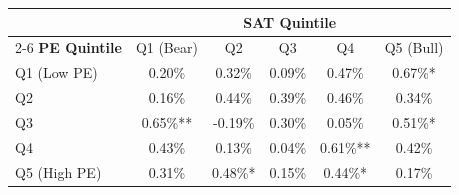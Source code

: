 \begin{tabular}{lccccc}
\toprule
& \multicolumn{5}{c}{\textbf{SAT Quintile}} \\
\cmidrule(lr){2-6}
\textbf{PE Quintile} & Q1 (Bear) & Q2 & Q3 & Q4 & Q5 (Bull) \\
\midrule
Q1 (Low PE) & 0.20\% & 0.32\% & 0.09\% & 0.47\% & 0.67\%* \\
Q2 & 0.16\% & 0.44\% & 0.39\% & 0.46\% & 0.34\% \\
Q3 & 0.65\%** & -0.19\% & 0.30\% & 0.05\% & 0.51\%* \\
Q4 & 0.43\% & 0.13\% & 0.04\% & 0.61\%** & 0.42\% \\
Q5 (High PE) & 0.31\% & 0.48\%* & 0.15\% & 0.44\%* & 0.17\% \\
\bottomrule
\end{tabular}
